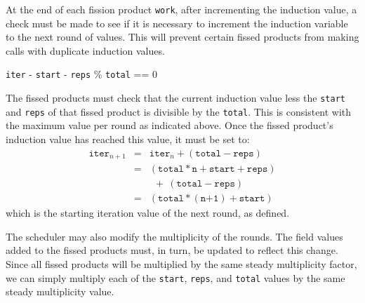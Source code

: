 At the end of each fission product \texttt{work}, after incrementing the 
induction value, a check must be made to see if it is necessary to increment 
the induction variable to the next round of  values.  This will prevent certain
fissed products from making calls with duplicate induction values.  
\begin{center}
\texttt{iter} - \texttt{start} - \texttt{reps} \% \texttt{total} == 0
\end{center}
The fissed products must check that the current induction value less the 
\texttt{start} and \texttt{reps} of that fissed product is divisible by the 
\texttt{total}.  This is consistent with the maximum value per round as 
indicated above.  Once the fissed product's induction value has reached 
this value, it must be set to:
\begin{eqnarray*}
\texttt{iter}_{n+1} &=& \texttt{iter}_{n} + (\texttt{total} - \texttt{reps}) \\
&=& (\texttt{total}*\texttt{n} + \texttt{start} + \texttt{reps}) \\
&&  \ \ +\ (\texttt{total} - \texttt{reps}) \\
&=& (\texttt{total}*(\texttt{n+1}) + \texttt{start})
\end{eqnarray*}
which is the starting iteration value of the next round, as defined.

The scheduler may also modify the multiplicity of the rounds.  The field values
added to the fissed products must, in turn, be updated to reflect this change.
Since all fissed products will be multiplied by the same steady multiplicity
factor, we can simply multiply each of the \texttt{start}, \texttt{reps}, and 
\texttt{total} values by the same steady multiplicity value.
